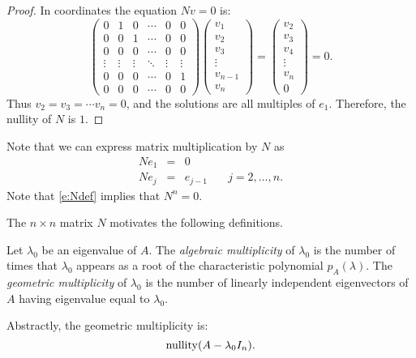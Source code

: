\documentclass{ximera}
\begin{document}
\begin{proof}  In coordinates the equation $Nv=0$ is:
\[
\left(\begin{array}{cccccc} 0 & 1 & 0 & \cdots & 0 & 0\\
	0 & 0 & 1 & \cdots & 0 & 0 \\
	0 & 0 & 0  & \cdots & 0 & 0\\
	\vdots & \vdots & \vdots & \ddots & \vdots & \vdots\\
	0 & 0 & 0 & \cdots & 0 & 1 \\
	0 & 0 & 0 & \cdots & 0 & 0 \end{array}\right)
\left(\begin{array}{l} v_1 \\ v_2 \\ v_3 \\ \vdots \\ v_{n-1} \\v_n
	\end{array}\right) 
= \left(\begin{array}{l} v_2 \\ v_3 \\ v_4 \\ \vdots \\ v_n \\ 0
	\end{array}\right) = 0.
\]
Thus $v_2 = v_3 = \cdots v_n = 0$, and the solutions are all multiples 
of $e_1$.  Therefore, the nullity of $N$ is $1$.  \end{proof}

Note that we can express matrix multiplication by $N$ as
\begin{equation}  \label{e:Ndef}
\begin{array}{rcll} 
Ne_1 & = & 0 & \\
Ne_j & = & e_{j-1} & \quad j=2,\ldots,n .
\end{array}
\end{equation}
Note that \eqref{e:Ndef} implies that $N^n=0$.

The $n\times n$ matrix $N$ motivates the following definitions.  
\begin{definition} \label{D:multiplicities}
Let $\lambda_0$ be an eigenvalue of $A$.  The {\em algebraic multiplicity\/} 
 of $\lambda_0$ is the number of times 
that $\lambda_0$ appears as a root of the characteristic polynomial 
$p_A(\lambda)$.  The {\em geometric multiplicity\/} 
 of $\lambda_0$ is the number of linearly 
independent eigenvectors of $A$ having eigenvalue equal to $\lambda_0$.
\end{definition}  
Abstractly, the geometric multiplicity is:
\[
{\rm nullity}(A-\lambda_0I_n).
\]
\end{document}
